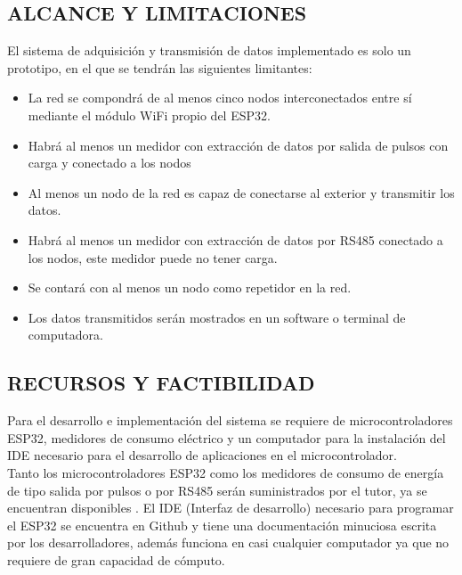 \documentclass[12pt,letterpaper]{article}
\begin{document}
	
		\begin{center}
		
		\section*{ ALCANCE Y LIMITACIONES}	
	\end{center}
	
	El sistema de adquisición y transmisión de datos implementado es solo un prototipo, en el que se tendrán las siguientes limitantes:
		
	\begin{itemize}
	
	\item La red se compondrá de al menos cinco nodos interconectados entre sí mediante el módulo WiFi propio del ESP32.
	
	\item Habrá al menos un medidor con extracción de datos por salida de pulsos con carga y conectado a los nodos
	
	\item Al menos un nodo de la red es capaz de conectarse al exterior y transmitir los datos. 
	
	\item Habrá al menos un medidor con extracción de datos por RS485 conectado a los nodos, este medidor puede no tener carga. 
	
	\item Se contará con al menos un nodo como repetidor en la red.
	
	\item Los datos transmitidos serán mostrados en un software o terminal de computadora.
	
		
	\end{itemize}
	
	
	\begin{center}		
		\section*{ RECURSOS Y FACTIBILIDAD}	
	\end{center}

	Para el desarrollo e implementación del sistema se requiere de microcontroladores ESP32, medidores de consumo eléctrico y un computador para la instalación del IDE necesario para el desarrollo de aplicaciones en el microcontrolador.\\
	
	Tanto los microcontroladores ESP32 como los medidores de consumo de energía de tipo salida por pulsos o por RS485 serán suministrados por el tutor, ya se encuentran disponibles . El IDE (Interfaz de desarrollo) necesario para programar el ESP32 se encuentra en Github y tiene una documentación minuciosa escrita por los desarrolladores, además funciona en casi cualquier computador ya que no requiere de gran capacidad de cómputo.	\\
	
\end{document}
